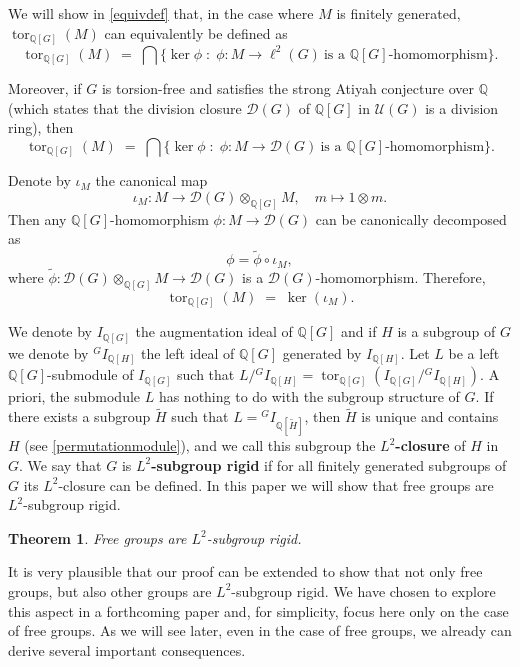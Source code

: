 \documentclass{amsart}
\newtheorem{teo}[lem]{Theorem}
\theoremstyle{definition}
\theoremstyle{remark}
\DeclareMathOperator{\tor}{tor}
\newcommand{\Q}{\mathbb{Q}}
\begin{document}
We will show in \cref{equivdef} that, in the case where $M$ is finitely generated, $\tor_{\mathbb{Q}[G]}(M)$ can equivalently be defined as
\[
\tor_{\mathbb{Q}[G]}(M) \;=\; \bigcap \{ \ker \phi \;\colon\; \phi : M \to \ell^2(G) \ \text{is a $\mathbb{Q}[G]$-homomorphism} \}.
\]

Moreover, if $G$ is torsion-free and satisfies the strong Atiyah conjecture over $\mathbb{Q}$ (which states that the division closure $\mathcal D(G)$ of $\mathbb{Q}[G]$ in $\mathcal U(G)$ is a division ring), then
\[
\tor_{\mathbb{Q}[G]}(M) \;=\; \bigcap \{ \ker \phi \;\colon\; \phi : M \to \mathcal D(G) \ \text{is a $\mathbb{Q}[G]$-homomorphism} \}.
\]

Denote by $\iota_M$ the canonical map
\[
\iota_M : M \longrightarrow \mathcal D(G) \otimes_{\mathbb{Q}[G]} M, 
\quad m \longmapsto 1 \otimes m.
\]
Then any $\mathbb{Q}[G]$-homomorphism $\phi : M \to \mathcal D(G)$ can be canonically decomposed as 
\[
\phi = \widetilde{\phi} \circ \iota_M,
\]
where $\widetilde{\phi} : \mathcal D(G) \otimes_{\mathbb{Q}[G]} M \to \mathcal D(G)$ is a $\mathcal D(G)$-homomorphism.  
Therefore,
\[
\tor_{\mathbb{Q}[G]}(M) \;=\; \ker(\iota_M).
\]


 We denote by $I_{\Q[G]}$ the augmentation ideal of $\Q[G]$ and if $H$ is a subgroup of $G$ we denote by ${}^G I_{\Q[H]}$ 
the left ideal of $\Q[G]$ generated by $I_{\Q[H]}$.  Let $L$ be a left $\Q[G]$-submodule of $I_{\Q[G]}$ such that $L/{}^G I_{\Q[H]}=\tor_{\Q[G]}(I_{\Q[G]}/{}^GI_{\Q[H]})$. A priori, the submodule $L$  has nothing to do with the subgroup structure of $G$. 
If  there exists a subgroup $\widetilde H$  such that  $L={}^GI_{\Q[\widetilde H]}$,
then $\widetilde H$ is unique and contains $H$ (see \cref{permutationmodule}), and we call this subgroup the {\bf $L^2$-closure} of $H$ in $G$.   
We say that $G$ is {\bf $L^2$-subgroup rigid} if for all finitely generated subgroups of $G$ its $L^2$-closure can be defined.
In this paper we will show that free groups are $L^2$-subgroup rigid.
\begin{teo}\label{main}
Free groups are $L^2$-subgroup rigid.
\end{teo}
It is very plausible that our proof can be extended to show that not only free groups, but also other groups are $L^2$-subgroup rigid. We have chosen to explore this aspect in a forthcoming paper and, for simplicity, focus here only on the case of free groups. As we will see later, even in the case of free groups, we already can derive several important consequences.
\end{document}
